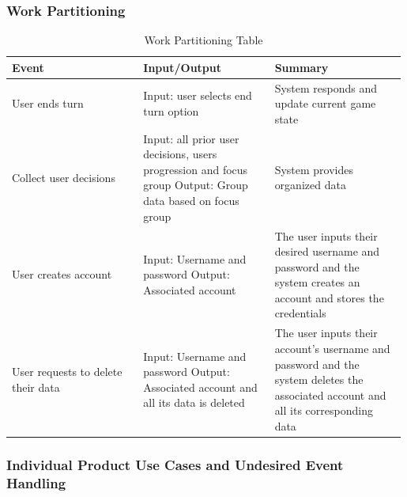 \documentclass{article}
\begin{document}
\subsubsection{Work Partitioning}
\begin{table}[h]
    \centering
    \begin{tabular}{|p{0.33\linewidth} | p{0.33\linewidth} | p{0.33\linewidth}| }
    \hline
         Event & Input/Output & Summary \\
         \hline
         User ends turn & Input: user selects end turn option & System responds and update current game state\\
         \hline 
         Collect user decisions & Input: all prior user decisions, users progression and focus group \newline Output: Group data based on focus group  & System provides organized data \\
         \hline 
          User creates account & Input: Username and password \newline Output: Associated account & The user inputs their desired username and password and the system creates an account and stores the credentials\\
         \hline 
         User requests to delete their data & Input: Username and password \newline Output: Associated account and all its data is deleted & The user inputs their account's username and password and the system deletes the associated account and all its corresponding data\\
         \hline 
    \end{tabular}
    \caption{Work Partitioning Table}
    \label{tab:my_label}
\end{table}

\subsubsection{Individual Product Use Cases and Undesired Event Handling}
\end{document}
